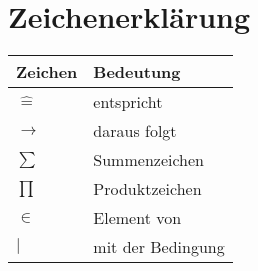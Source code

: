 \documentclass{./formulaCollection}
\begin{document}
\section{Zeichenerklärung}

\begin{tabular}[h]{l|l}
Zeichen &Bedeutung  \\
\hline
$\widehat{=}$ & entspricht  \\
$\longrightarrow$ & daraus folgt \\
$\sum$ & Summenzeichen \\
$\prod$ & Produktzeichen \\
$ \in$ & Element von \\
$ |$ & mit der Bedingung \\
\end{tabular}
\end{document}

